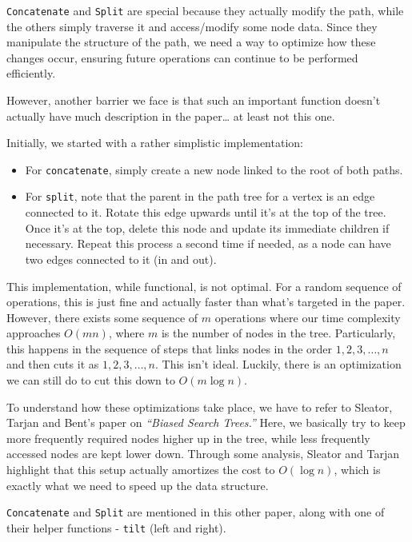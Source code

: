 \documentclass[a4paper, 11pt]{article}
\begin{document}
\texttt{Concatenate} and \texttt{Split} are special because they actually modify the path, while the others simply traverse it and access/modify some node data. Since they manipulate the structure of the path, we need a way to optimize how these changes occur, ensuring future operations can continue to be performed efficiently.

However, another barrier we face is that such an important function doesn’t actually have much description in the paper… at least not this one.

Initially, we started with a rather simplistic implementation:

\begin{itemize}
    \item For \texttt{concatenate}, simply create a new node linked to the root of both paths.
    \item For \texttt{split}, note that the parent in the path tree for a vertex is an edge connected to it. Rotate this edge upwards until it's at the top of the tree. Once it's at the top, delete this node and update its immediate children if necessary. Repeat this process a second time if needed, as a node can have two edges connected to it (in and out).
\end{itemize}

This implementation, while functional, is not optimal. For a random sequence of operations, this is just fine and actually faster than what's targeted in the paper. However, there exists some sequence of \(m\) operations where our time complexity approaches \(O(mn)\), where \(m\) is the number of nodes in the tree. Particularly, this happens in the sequence of steps that links nodes in the order $1, 2, 3,\ldots, n$ and then cuts it as $1, 2, 3, \ldots, n$. This isn't ideal. Luckily, there is an optimization we can still do to cut this down to \(O(m \log n)\).

To understand how these optimizations take place, we have to refer to Sleator, Tarjan and Bent's paper on \emph{“Biased Search Trees.”} \cite{BiasedSTrees} Here, we basically try to keep more frequently required nodes higher up in the tree, while less frequently accessed nodes are kept lower down. Through some analysis, Sleator and Tarjan highlight that this setup actually amortizes the cost to \(O(\log n)\), which is exactly what we need to speed up the data structure.

\texttt{Concatenate} and \texttt{Split} are mentioned in this other paper, along with one of their helper functions - \texttt{tilt} (left and right).
\end{document}
